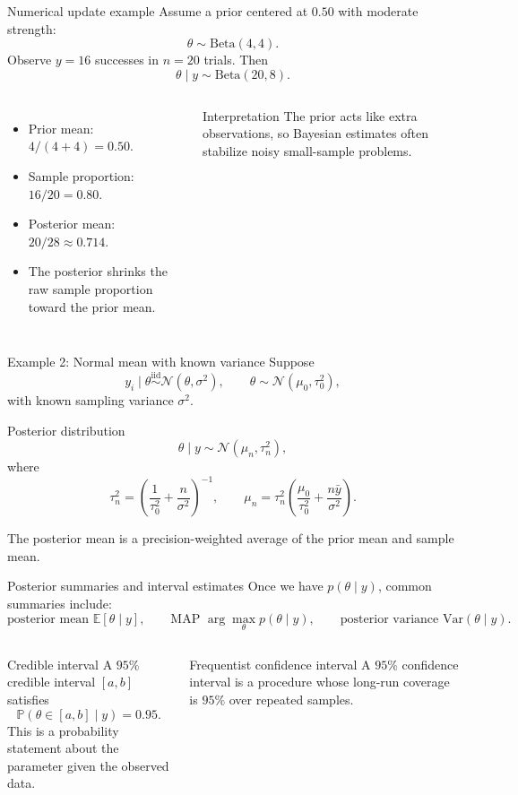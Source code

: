 \documentclass[aspectratio=169]{beamer}
\newcommand{\E}{\mathbb{E}}
\newcommand{\Var}{\mathrm{Var}}
\newcommand{\Prb}{\mathbb{P}}
\newcommand{\Normal}{\mathcal{N}}
\newcommand{\BetaD}{\mathrm{Beta}}
\newcommand{\iid}{\stackrel{\mathrm{iid}}{\sim}}
\begin{document}
\begin{frame}{Numerical update example}
Assume a prior centered at $0.50$ with moderate strength:
\[
  \theta \sim \BetaD(4,4).
\]
Observe $y=16$ successes in $n=20$ trials. Then
\[
  \theta\mid y \sim \BetaD(20,8).
\]

\begin{columns}[T,onlytextwidth]
\begin{itemize}
  \item Prior mean: $4/(4+4)=0.50$.
  \item Sample proportion: $16/20=0.80$.
  \item Posterior mean: $20/28\approx 0.714$.
  \item The posterior shrinks the raw sample proportion toward the prior mean.
\end{itemize}

\begin{block}{Interpretation}
The prior acts like extra observations, so Bayesian estimates often stabilize noisy small-sample problems.
\end{block}
\end{columns}
\end{frame}

\begin{frame}{Example 2: Normal mean with known variance}
Suppose
\[
  y_i \mid \theta \iid \Normal(\theta,\sigma^2),
  \qquad
  \theta \sim \Normal(\mu_0,\tau_0^2),
\]
with known sampling variance $\sigma^2$.

\begin{block}{Posterior distribution}
\[
  \theta\mid y \sim \Normal(\mu_n,\tau_n^2),
\]
where
\[
  \tau_n^2=\left(\frac{1}{\tau_0^2}+\frac{n}{\sigma^2}\right)^{-1},
  \qquad
  \mu_n=\tau_n^2\left(\frac{\mu_0}{\tau_0^2}+\frac{n\bar y}{\sigma^2}\right).
\]
\end{block}
The posterior mean is a precision-weighted average of the prior mean and sample mean.
\end{frame}

\begin{frame}{Posterior summaries and interval estimates}
Once we have $p(\theta\mid y)$, common summaries include:
\[
  \text{posterior mean }\E[\theta\mid y],
  \qquad
  \text{MAP }\arg\max_{\theta} p(\theta\mid y),
  \qquad
  \text{posterior variance }\Var(\theta\mid y).
\]

\begin{columns}[T,onlytextwidth]
\begin{block}{Credible interval}
A $95\%$ credible interval $[a,b]$ satisfies
\[
  \Prb(\theta\in[a,b]\mid y)=0.95.
\]
This is a probability statement about the parameter given the observed data.
\end{block}

\begin{block}{Frequentist confidence interval}
A $95\%$ confidence interval is a procedure whose long-run coverage is $95\%$ over repeated samples.
\end{block}
\end{columns}
\end{frame}
\end{document}
